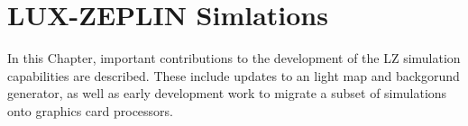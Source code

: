\chapter{LUX-ZEPLIN Simlations}
\par
In this Chapter, important contributions to the development of the LZ simulation capabilities are described.
These include updates to an light map and backgorund generator, as well as early development work to migrate a subset of simulations onto graphics card processors.





